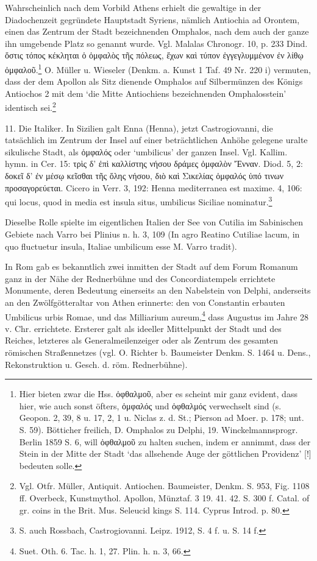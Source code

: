 \documentclass[a4paper, 11pt, oneside]{article}
\begin{document}
Wahrscheinlich nach dem Vorbild Athens erhielt die gewaltige in der Diadochenzeit gegründete Hauptstadt Syriens, nämlich Antiochia ad Orontem, einen das Zentrum der Stadt bezeichnenden Omphalos, nach dem auch der ganze ihn umgebende Platz so genannt wurde. Vgl. Malalas Chronogr. 10, p. 233 Dind. ὅστις τόπος κέκληται ὁ ὀμφαλὸς τῆς πόλεως, ἔχων καὶ τύπον ἐγγεγλυμμένον ἐν λίθῳ ὀμφαλοῦ.\footnote{Hier bieten zwar die Hss. ὀφθαλμοῦ, aber es scheint mir ganz evident, dass hier, wie auch sonst öfters, ὀμφαλός und ὀφθαλμός verwechselt sind (s. Geopon. 2, 39, 8 u. 17, 2, 1 u. Niclas z. d. St.; Pierson ad Moer. p. 178; unt. S. 59). Bötticher freilich, D. Omphalos zu Delphi, 19. Winckelmannsprogr. Berlin 1859 S. 6, will ὀφθαλμοῦ zu halten suchen, indem er annimmt, dass der Stein in der Mitte der Stadt `das allsehende Auge der göttlichen Providenz' [!] bedeuten solle.} O. Müller u. Wieseler (Denkm. a. Kunst 1 Taf. 49 Nr. 220 i) vermuten, dass der dem Apollon als Sitz dienende Omphalos auf Silbermünzen des Königs Antiochos 2 mit dem `die Mitte Antiochiens bezeichnenden Omphalosstein' identisch sei.\footnote{Vgl. Otfr. Müller, Antiquit. Antiochen. Baumeister, Denkm. S. 953, Fig. 1108 ff. Overbeck, Kunstmythol. Apollon, Münztaf. 3 19. 41. 42. S. 300 f. Catal. of gr. coins in the Brit. Mus. Seleucid kings S. 114. Cyprus Introd. p. 80.}

11. Die Italiker. In Sizilien galt Enna (Henna), jetzt Castrogiovanni, die tatsächlich im Zentrum der Insel auf einer beträchtlichen Anhöhe gelegene uralte sikulische Stadt, als ὀμφαλός oder `umbilicus' der ganzen Insel. Vgl. Kallim. hymn. in Cer. 15: τρὶς δ' ἐπὶ καλλίστης νήσου δράμες ὀμφαλὸν Ἔνναν. Diod. 5, 2: δοκεῖ δ' ἐν μέσῳ κεῖσθαι τῆς ὅλης νήσου, διὸ καὶ Σικελίας ὀμφαλός ὑπό τινων προσαγορεύεται. Cicero in Verr. 3, 192: Henna mediterranea est maxime. 4, 106: qui locus, quod in media est insula situs, umbilicus Siciliae nominatur.\footnote{S. auch Rossbach, Castrogiovanni. Leipz. 1912, S. 4 f. u. S. 14 f.}

Dieselbe Rolle spielte im eigentlichen Italien der See von Cutilia im Sabinischen Gebiete nach Varro bei Plinius n. h. 3, 109 (In agro Reatino Cutiliae lacum, in quo fluctuetur insula, Italiae umbilicum esse M. Varro tradit).

In Rom gab es bekanntlich zwei inmitten der Stadt auf dem Forum Romanum ganz in der Nähe der Rednerbühne und des Concordiatempels errichtete Monumente, deren Bedeutung einerseits an den Nabelstein von Delphi, anderseits an den Zwölfgötteraltar von Athen erinnerte: den von Constantin erbauten Umbilicus urbis Romae, und das Milliarium aureum,\footnote{Suet. Oth. 6. Tac. h. 1, 27. Plin. h. n. 3, 66.} dass Augustus im Jahre 28 v. Chr. errichtete. Ersterer galt als ideeller Mittelpunkt der Stadt und des Reiches, letzteres als Generalmeilenzeiger oder als Zentrum des gesamten römischen Straßennetzes (vgl. O. Richter b. Baumeister Denkm. S. 1464 u. Dens., Rekonstruktion u. Gesch. d. röm. Rednerbühne).
\end{document}
